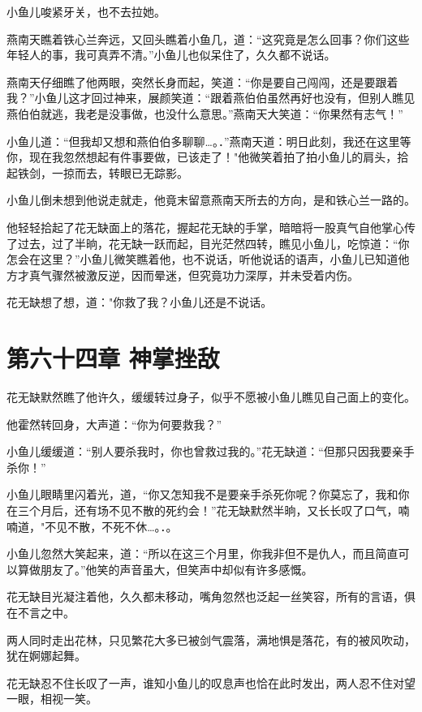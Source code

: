 \documentclass[12pt,oneside]{book}
\begin{document}
小鱼儿唆紧牙关，也不去拉她。

燕南天瞧着铁心兰奔远，又回头瞧着小鱼几，道：``这究竟是怎么回事？你们这些年轻人的事，我可真弄不清。''小鱼儿也似呆住了，久久都不说话。

燕南天仔细瞧了他两眼，突然长身而起，笑道：``你是要自己闯闯，还是要跟着我？''小鱼儿这才回过神来，展颜笑道：``跟着燕伯伯虽然再好也没有，但别人瞧见燕伯伯就逃，我老是没事做，也没什么意思。''燕南天大笑道：``你果然有志气！''

小鱼儿道：``但我却又想和燕伯伯多聊聊\ldots。．''燕南天道：明日此刻，我还在这里等你，现在我忽然想起有件事要做，已该走了！"他微笑着拍了拍小鱼儿的肩头，拾起铁剑，一掠而去，转眼已无踪影。

小鱼儿倒未想到他说走就走，他竟末留意燕南天所去的方向，是和铁心兰一路的。

他轻轻拾起了花无缺面上的落花，握起花无缺的手掌，暗暗将一股真气自他掌心传了过去，过了半晌，花无缺一跃而起，目光茫然四转，瞧见小鱼儿，吃惊道：``你怎会在这里？''小鱼儿微笑瞧着他，也不说话，听他说话的语声，小鱼儿已知道他方才真气骤然被激反逆，因而晕迷，但究竟功力深厚，并未受着内伤。

花无缺想了想，道："你救了我？小鱼儿还是不说话。

\hypertarget{ux7b2cux516dux5341ux56dbux7ae0-ux795eux638cux632bux654c}{%
\chapter{第六十四章
神掌挫敌}\label{ux7b2cux516dux5341ux56dbux7ae0-ux795eux638cux632bux654c}}

花无缺默然瞧了他许久，缓缓转过身子，似乎不愿被小鱼儿瞧见自己面上的变化。

他霍然转回身，大声道：``你为何要救我？''

小鱼儿缓缓道：``别人要杀我时，你也曾救过我的。''花无缺道：``但那只因我要亲手杀你！''

小鱼儿眼睛里闪着光，道，``你又怎知我不是要亲手杀死你呢？你莫忘了，我和你在三个月后，还有场不见不散的死约会！''花无缺默然半晌，又长长叹了口气，喃喃道，"不见不散，不死不休\ldots。．。

小鱼儿忽然大笑起来，道：``所以在这三个月里，你我非但不是仇人，而且简直可以算做朋友了。''他笑的声音虽大，但笑声中却似有许多感慨。

花无缺目光凝注着他，久久都未移动，嘴角忽然也泛起一丝笑容，所有的言语，俱在不言之中。

两人同时走出花林，只见繁花大多已被剑气震落，满地惧是落花，有的被风吹动，犹在婀娜起舞。

花无缺忍不住长叹了一声，谁知小鱼儿的叹息声也恰在此时发出，两人忍不住对望一眼，相视一笑。
\end{document}

